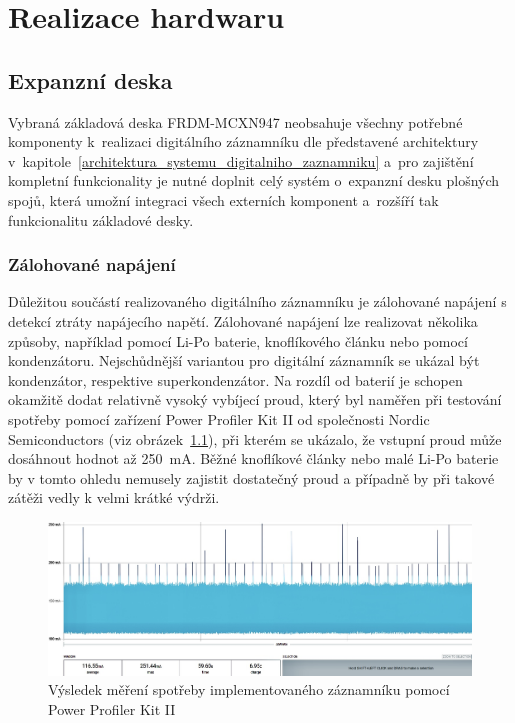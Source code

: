 
\chapter{Realizace hardwaru}
\label{realizace_hardwaru}

\section{Expanzní deska}
\label{expanzni_deska}
Vybraná základová deska FRDM-MCXN947 neobsahuje všechny potřebné komponenty k~realizaci digitálního záznamníku dle představené architektury v~kapitole~\ref{architektura_systemu_digitalniho_zaznamniku} a~pro zajištění kompletní funkcionality je nutné doplnit celý systém o~expanzní desku plošných spojů, která umožní integraci všech externích komponent a~rozšíří tak funkcionalitu základové desky.

\subsection{Zálohované napájení}
\label{zalohovane_napajeni_hw}
Důležitou součástí realizovaného digitálního záznamníku je zálohované napájení s detekcí ztráty napájecího napětí. Zálohované napájení lze realizovat několika způsoby, například pomocí Li-Po baterie, knoflíkového článku nebo pomocí kondenzátoru. Nejschůdnější variantou pro digitální záznamník se ukázal být kondenzátor, respektive superkondenzátor. Na rozdíl od baterií je schopen okamžitě dodat relativně vysoký vybíjecí proud, který byl naměřen při testování spotřeby pomocí zařízení Power Profiler Kit II od společnosti Nordic Semiconductors (viz obrázek~\ref{fig:power-consumption}), při kterém se ukázalo, že vstupní proud může dosáhnout hodnot až \SI{250}{\milli\ampere}. Běžné knoflíkové články nebo malé Li-Po baterie by v tomto ohledu nemusely zajistit dostatečný proud a případně by při takové zátěži vedly k velmi krátké výdrži.~\cite{nordic_semi_ppk2}

\begin{figure}[h]
    \centering
    \includegraphics[width=1.00\textwidth]{obrazky-figures/power-consumption-4.jpg}
    
    \caption{Výsledek měření spotřeby implementovaného záznamníku pomocí Power Profiler Kit II 
   ~\cite{nordic_semi_ppk2}}
    \label{fig:power-consumption}
\end{figure}

